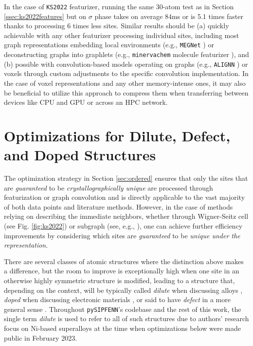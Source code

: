 In the case of \texttt{KS2022} featurizer, running the same 30-atom test as in Section \ref{ssec:ks2022features} but on $\sigma$ phase takes on average $84$ms or is 5.1 times faster thanks to processing 6 times less sites. Similar results should be (a) quickly achievable with any other featurizer processing individual sites, including most graph representations embedding local environments (e.g., \texttt{MEGNet} \cite{Chen2019GraphCrystals}) or deconstructing graphs into graphlets (e.g., \texttt{minervachem} molecule featurizer \cite{Tynes2024LinearCheminformatics}), and (b) possible with convolution-based models operating on graphs (e.g., \texttt{ALIGNN} \cite{Choudhary2021AtomisticPredictions}) or voxels \cite{Davariashtiyani2023FormationRepresentation} through custom adjustments to the specific convolution implementation. In the case of voxel representations and any other memory-intense ones, it may also be beneficial to utilize this approach to compress them when transferring between devices like CPU and GPU or across an HPC network.


\section{Optimizations for Dilute, Defect, and Doped Structures} \label{sec:dilute}

The optimization strategy in Section \ref{sec:ordered} ensures that only the sites that are \emph{guaranteed} to be \emph{crystallographically unique} are processed through featurization or graph convolution and is directly applicable to the vast majority of both data points and literature methods. However, in the case of methods relying on describing the immediate neighbors, whether through Wigner-Seitz cell (see Fig. \ref{fig:ks2022}) or subgraph (see, e.g., \cite{Chen2019GraphCrystals}), one can achieve further efficiency improvements by considering which sites are \emph{guaranteed} to be \emph{unique under the representation}.

There are several classes of atomic structures where the distinction above makes a difference, but the room to improve is exceptionally high when one site in an otherwise highly symmetric structure is modified, leading to a structure that, depending on the context, will be typically called \emph{dilute} when discussing alloys \cite{Chong2021CorrelationAlloys}, \emph{doped} when discussing electronic materials \cite{Chen2022InteractionStudy}, or said to have \emph{defect} in a more general sense \cite{Castleton2009DensitySupercells}. Throughout \texttt{pySIPFENN}'s codebase and the rest of this work, the single term \emph{dilute} is used to refer to all of such structures due to authors' research focus on Ni-based superalloys at the time when optimizations below were made public in February 2023.

